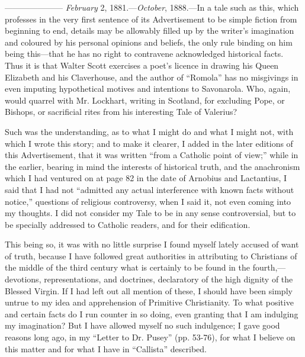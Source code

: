 ———————
\emph{February} 2, 1881.—\emph{October}, 1888.—In a
tale such as this, which professes in the very first sentence of its
Advertisement to be simple fiction from beginning to end, details may be
allowably filled up by the writer's imagination and coloured by his
personal opinions and beliefs, the only rule binding on him being this—that
he has no right to contravene acknowledged historical facts. Thus it is
that Walter Scott exercises a poet's licence in drawing his Queen
Elizabeth and his Claverhouse, and the author of ``Romola'' has
no misgivings in even imputing hypothetical motives and intentions to
Savonarola. Who, again, would quarrel with Mr. Lockhart, writing in
Scotland, for excluding Pope, or Bishops, or sacrificial rites from his
interesting Tale of Valerius?


Such was the understanding, as to what I might do and
what I might not, with which I wrote this story; and to make it clearer,
I added in the later editions of this Advertisement, that it was written
``from a Catholic point of view;'' while in the earlier, bearing
in mind the interests of historical truth, and the anachronism which I
had ventured on at page 82 in the date of Arnobius and Lactantius, I
said that I had not ``admitted any actual interference with known
facts without notice,'' questions of religious controversy, when I
said it, not even coming into my thoughts. I did not consider my Tale to
be in any sense controversial, but to be specially addressed to Catholic
readers, and for their edification.


This being so, it was with no little surprise I found
myself lately accused of want of truth, because I have followed great
authorities in attributing to Christians of the middle of the third
century what is certainly to be found in the fourth,—devotions,
representations, and doctrines, declaratory of the high dignity of the
Blessed Virgin. If I had left out all mention of these, I should have
been simply untrue to my idea and apprehension of Primitive
Christianity. To what positive and certain facts do I run counter in so
doing, even granting that I am indulging my imagination? But I have
allowed myself no such indulgence; I gave good reasons long ago, in my
``Letter to Dr. Pusey'' (pp. 53-76), for what I believe on this
matter and for what I have in ``Callista'' described.



